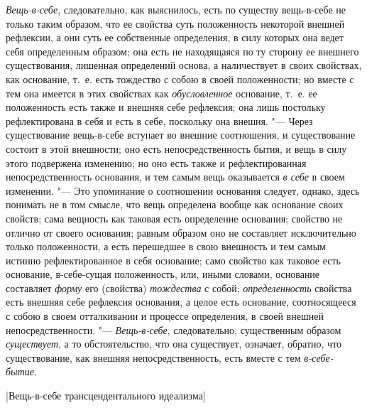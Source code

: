 {\em Вещь-в-себе}, следовательно, как выяснилось, есть
по существу вещь-в-себе не только таким образом, что ее свойства суть
положенность некоторой внешней рефлексии, а они суть ее собственные
определения, в силу которых она ведет себя определенным образом; она есть
не находящаяся по ту сторону ее внешнего существования, лишенная
определений основа, а наличествует в своих свойствах, как основание, т.~е.
есть тождество с собою в своей положенности; но вместе с тем она имеется в
этих свойствах как {\em обусловленное} основание, т.~е.
ее положенность есть также и внешняя себе рефлексия; она лишь постольку
рефлектирована в себя и есть в себе, поскольку она внешня. "--- Через
существование вещь-в-себе вступает во внешние соотношения, и существование
состоит в этой внешности; оно есть непосредственность бытия, и вещь в силу
этого подвержена изменению; но оно есть также и рефлектированная
непосредственность основания, и тем самым вещь оказывается
{\em в себе} в своем изменении. "--- Это упоминание о
соотношении основания следует, однако, здесь понимать не в том смысле, что
вещь определена вообще как основание своих свойств; сама вещность как
таковая есть определение основания; свойство не отлично от своего
основания; равным образом оно не составляет исключительно только
положенности, а есть перешедшее в свою внешность и тем самым истинно
рефлектированное в себя основание; само свойство как таковое есть
основание, в-себе-сущая положенность, или, иными словами, основание
составляет {\em форму} его (свойства) {\em тождества} с собой;
{\em определенность} свойства есть внешняя себе
рефлексия основания, а целое есть основание, соотносящееся с собою в своем
отталкивании и процессе определения, в своей внешней непосредственности. "---
{\em Вещь-в-себе}, следовательно, существенным образом
{\em существует}, а то обстоятельство, что она
существует, означает, обратно, что существование, как внешняя
непосредственность, есть вместе с тем {\em в-себе-бытие}.

%
  {[Вещь-в-себе трансцендентального идеализма]}

